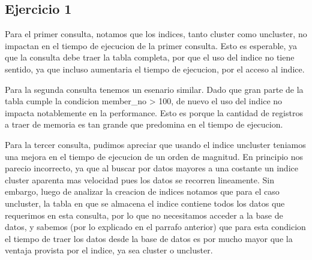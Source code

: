 \subsection{Ejercicio 1}

Para el primer consulta, notamos que los indices, tanto cluster como uncluster, no impactan en el tiempo de ejecucion de la primer consulta. Esto es esperable, ya que la consulta  debe traer la tabla completa, por que el uso del indice no tiene sentido, ya que incluso aumentaria el tiempo de ejecucion, por el acceso al indice.

Para la segunda consulta tenemos un esenario similar. Dado que gran parte de la tabla cumple la condicion member_no > 100, de nuevo el uso del indice no impacta notablemente en la performance. Esto es porque la cantidad de registros a traer de memoria es tan grande que predomina en el tiempo de ejecucion.

Para la tercer consulta, pudimos apreciar que usando el indice uncluster teniamos una mejora en el tiempo de ejecucion de un orden de magnitud. En principio nos parecio incorrecto, ya que al buscar por datos mayores a una costante un indice cluster aparenta mas velocidad pues los datos se recorren lineamente. Sin embargo, luego de analizar la creacion de indices notamos que para el caso uncluster, la tabla en que se almacena el indice contiene todos los datos que requerimos en esta consulta, por lo que no necesitamos acceder a la base de datos, y sabemos (por lo explicado en el parrafo anterior) que para esta condicion el tiempo de traer los datos desde la base de datos es por mucho mayor que la ventaja provista por el indice, ya sea cluster o uncluster.



